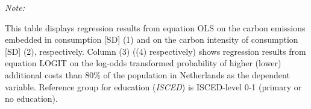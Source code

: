 \begin{table}[htbp!]
\begin{adjustbox}{width = 1\textwidth, max height = 0.95\textheight, center}
\begin{threeparttable}[b]
         \begin{tablenotes}\item \medskip \textit{Note:}
            \item This table displays regression results from equation OLS on the carbon emissions embedded in consumption [SD] (1) and on the carbon intensity of consumption [SD] (2), respectively. 
                                      Column (3) ((4) respectively) shows regression results from equation LOGIT on the log-odds transformed probability of higher (lower) additional costs than 80\% of the population in Netherlands as the dependent variable. Reference group for education (\textit{ISCED}) is ISCED-level 0-1 (primary or no education).
         \end{tablenotes}
      \end{threeparttable}
   \end{adjustbox}
\end{table}


